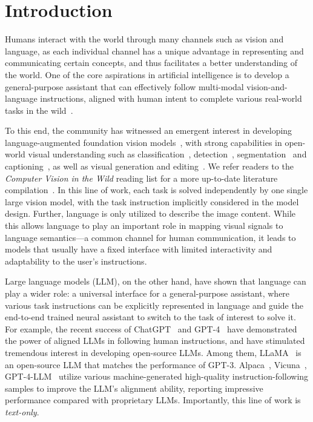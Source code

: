 \section{Introduction}

Humans interact with the world through many channels such as vision and language, as each individual channel has a unique advantage in representing and communicating certain concepts, and thus facilitates a better understanding of the world. One of the core aspirations in artificial intelligence is to develop a general-purpose assistant that can effectively follow multi-modal  vision-and-language instructions, aligned with human intent to complete various real-world tasks in the wild~\cite{askell2021general,li2022elevater,li2023multimodal}.

To this end, the community has witnessed an emergent interest in developing language-augmented foundation vision models~\cite{li2022elevater,gan2022vision}, with strong capabilities in open-world visual understanding such as classification~\citep{radford2021learning,openclip,yuan2021florence,yang2022unicl,pham2021combined}, detection~\cite{li2022grounded,zhong2022regionclip,liu2023grounding}, segmentation~\citep{li2022language,zou2022generalized,zhang2023simple} and captioning~\citep{wang2022git,li2023blip}, as well as visual generation and editing~\citep{DALLE2,LDM,PARTI,MAKEASCENE,Imagen,li2023gligen}. We refer readers to the {\it Computer Vision in the Wild} reading list for a more up-to-date literature compilation~\citep{cvinw}. In this line of work, each task is solved independently by one single large vision model, with the task instruction implicitly considered in the model design. Further, language is only utilized to describe the image content. While this allows language to play an important role in mapping visual signals to language semantics---a common channel for human communication, it leads to models that usually have a fixed interface with limited interactivity and adaptability to the user's instructions.

Large language models (LLM), on the other hand, have shown that language can play a wider role: a universal interface for a general-purpose assistant, where various task instructions can be explicitly represented in language and guide the end-to-end trained neural assistant to switch to the task of interest to solve it. For example, the recent success of ChatGPT~\citep{chatgpt} and GPT-4~\citep{gpt4} have demonstrated the power of aligned LLMs in following human instructions, and have stimulated tremendous interest in developing open-source LLMs. Among them, LLaMA~\citep{touvron2023llama} is an open-source LLM that matches the performance of GPT-3. Alpaca~\citep{alpaca}, Vicuna~\citep{vicuna}, GPT-4-LLM~\citep{peng2023instruction} utilize various machine-generated high-quality instruction-following samples to improve the LLM's alignment ability, reporting impressive  performance compared with proprietary LLMs. Importantly, this line of work is \emph{text-only}.  

